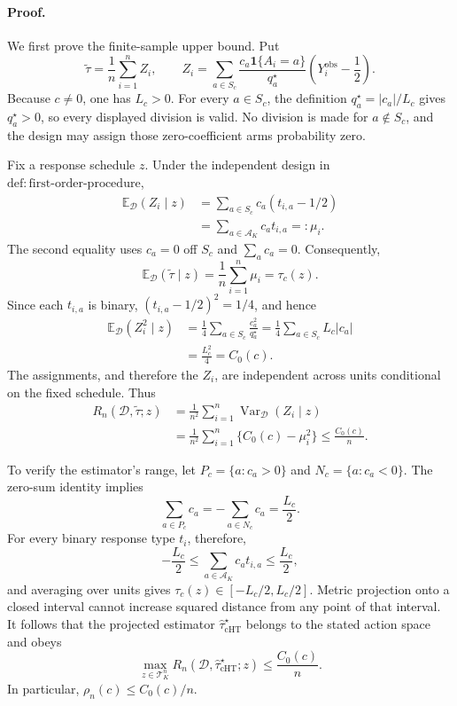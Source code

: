 \paragraph{Proof.}
We first prove the finite-sample upper bound.  Put
\[
 \widetilde\tau=\frac1n\sum_{i=1}^n Z_i,
 \qquad
 Z_i=\sum_{a\in S_c}
 \frac{c_a\mathbf 1\{A_i=a\}}{q_a^\star}
 \left(Y_i^{\mathrm{obs}}-\frac12\right).
\]
Because \(c\neq0\), one has \(L_c>0\).  For every \(a\in S_c\), the definition
\(q_a^\star=|c_a|/L_c\) gives \(q_a^\star>0\), so every displayed division is valid.  No division is made for \(a\notin S_c\), and the design may assign those zero-coefficient arms probability zero.

Fix a response schedule \(z\).  Under the independent design in \(\mathrm{def:first\text{-}order\text{-}procedure}\),
\[
 \begin{aligned}
 \mathbb E_{\mathcal D}(Z_i\mid z)
 &=\sum_{a\in S_c}c_a(t_{i,a}-1/2)\\
 &=\sum_{a\in\mathcal A_K}c_at_{i,a}=: \mu_i.
 \end{aligned}
\]
The second equality uses \(c_a=0\) off \(S_c\) and \(\sum_a c_a=0\).  Consequently,
\[
 \mathbb E_{\mathcal D}(\widetilde\tau\mid z)
 =\frac1n\sum_{i=1}^n\mu_i=\tau_c(z).
\]
Since each \(t_{i,a}\) is binary, \((t_{i,a}-1/2)^2=1/4\), and hence
\[
 \begin{aligned}
 \mathbb E_{\mathcal D}(Z_i^2\mid z)
 &=\frac14\sum_{a\in S_c}\frac{c_a^2}{q_a^\star}
 =\frac14\sum_{a\in S_c}L_c|c_a|\\
 &=\frac{L_c^2}{4}=C_0(c).
 \end{aligned}
\]
The assignments, and therefore the \(Z_i\), are independent across units conditional on the fixed schedule.  Thus
\[
 \begin{aligned}
 R_n(\mathcal D,\widetilde\tau;z)
 &=\frac1{n^2}\sum_{i=1}^n\operatorname{Var}_{\mathcal D}(Z_i\mid z)\\
 &=\frac1{n^2}\sum_{i=1}^n\{C_0(c)-\mu_i^2\}
 \leq\frac{C_0(c)}n.
 \end{aligned}
\]

To verify the estimator's range, let \(P_c=\{a:c_a>0\}\) and \(N_c=\{a:c_a<0\}\).  The zero-sum identity implies
\[
 \sum_{a\in P_c}c_a=-\sum_{a\in N_c}c_a=\frac{L_c}{2}.
\]
For every binary response type \(t_i\), therefore,
\[
 -\frac{L_c}{2}\leq\sum_{a\in\mathcal A_K}c_at_{i,a}\leq\frac{L_c}{2},
\]
and averaging over units gives \(\tau_c(z)\in[-L_c/2,L_c/2]\).  Metric projection onto a closed interval cannot increase squared distance from any point of that interval.  It follows that the projected estimator \(\widehat\tau_{\mathrm{cHT}}^\star\) belongs to the stated action space and obeys
\[
 \max_{z\in\mathcal T_K^n}
 R_n(\mathcal D,\widehat\tau_{\mathrm{cHT}}^\star;z)
 \leq\frac{C_0(c)}n.
\]
In particular, \(\rho_n(c)\leq C_0(c)/n\).

